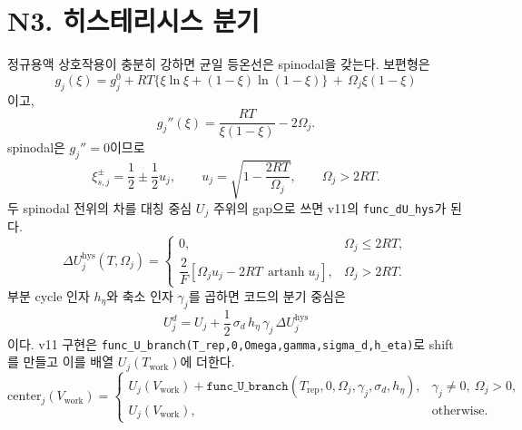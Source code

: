 \documentclass[11pt,a4paper]{article}
\newcommand{\hys}{\mathrm{hys}}
\newcommand{\work}{\mathrm{work}}
\newcommand{\artanh}{\operatorname{artanh}}
\begin{document}
\section{N3. 히스테리시스 분기}\label{sec:N3}
정규용액 상호작용이 충분히 강하면 균일 등온선은 spinodal을 갖는다. 보편형은
\begin{equation}
g_j(\xi)=g_j^0+RT\{\xi\ln\xi+(1-\xi)\ln(1-\xi)\}
\,+\,\Omega_j\xi(1-\xi)
\label{eq:gxi}
\end{equation}
이고,
\begin{equation}
g_j''(\xi)=\frac{RT}{\xi(1-\xi)}-2\Omega_j.
\label{eq:gpp}
\end{equation}
spinodal은 $g_j''=0$이므로
\begin{equation}
\xi_{s,j}^{\pm}=\frac12\pm\frac12 u_j,\qquad
u_j=\sqrt{1-\frac{2RT}{\Omega_j}},\qquad \Omega_j>2RT.
\label{eq:spinodal}
\end{equation}
두 spinodal 전위의 차를 대칭 중심 $U_j$ 주위의 gap으로 쓰면 v11의 \texttt{func\_dU\_hys}가 된다.
\begin{equation}
\boxed{\;
\Delta U_j^{\hys}(T,\Omega_j)=
\begin{cases}
0,&\Omega_j\le2RT,\\[2pt]
\dfrac{2}{F}\left[\Omega_j u_j-2RT\,\artanh u_j\right],&\Omega_j>2RT.
\end{cases}
\;}
\label{eq:dUhys}
\end{equation}
부분 cycle 인자 $h_\eta$와 축소 인자 $\gamma_j$를 곱하면 코드의 분기 중심은
\begin{equation}
\boxed{\;U_j^d=U_j+\frac12\,\sigma_d\,h_\eta\,\gamma_j\,\Delta U_j^{\hys}\;}
\label{eq:Ubranch}
\end{equation}
이다. v11 구현은 \texttt{func\_U\_branch(T\_rep,0,Omega,gamma,sigma\_d,h\_eta)}로 shift를 만들고 이를 배열 $U_j(T_{\work})$에 더한다.
\begin{equation}
\mathrm{center}_j(V_{\work})=
\begin{cases}
U_j(V_{\work})+\texttt{func\_U\_branch}(T_{\mathrm{rep}},0,\Omega_j,\gamma_j,\sigma_d,h_\eta),
&\gamma_j\ne0,\ \Omega_j>0,\\
U_j(V_{\work}),&\text{otherwise}.
\end{cases}
\label{eq:centerdispatch}
\end{equation}
\end{document}
